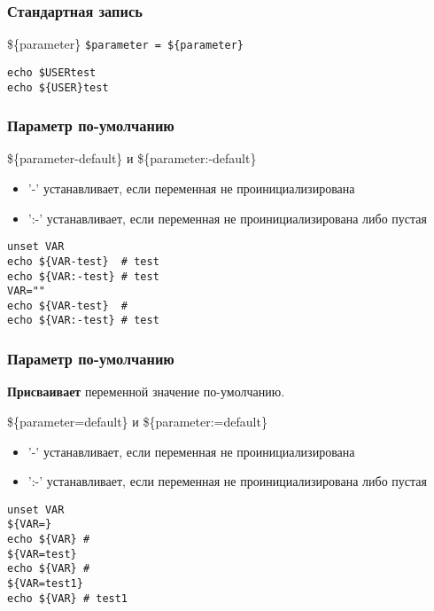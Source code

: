 

\begin{frame}[fragile]
	\frametitle{Стандартная запись}

	\begin{block}{\$\{parameter\}}
		{\tt \$parameter = \$\{parameter\}}

	\begin{lstlisting}
echo $USERtest
echo ${USER}test
	\end{lstlisting}
	\end{block}

\end{frame}

\begin{frame}[fragile]
	\frametitle{Параметр по-умолчанию}

	\begin{block}{\$\{parameter-default\} и \$\{parameter:-default\}}
	\begin{itemize}
		\item '-' устанавливает, если переменная не проинициализирована
		\item ':-' устанавливает, если переменная не проинициализирована либо пустая
	\end{itemize}
	\begin{lstlisting}
unset VAR
echo ${VAR-test}  # test
echo ${VAR:-test} # test
VAR=""
echo ${VAR-test}  #
echo ${VAR:-test} # test
	\end{lstlisting}
	\end{block}

\end{frame}

\begin{frame}[fragile]
	\frametitle{Параметр по-умолчанию}

	{\bf Присваивает} переменной значение по-умолчанию.

	\begin{block}{\$\{parameter=default\} и \$\{parameter:=default\}}
	\begin{itemize}
		\item '-' устанавливает, если переменная не проинициализирована
		\item ':-' устанавливает, если переменная не проинициализирована либо пустая
	\end{itemize}
	\begin{lstlisting}
unset VAR
${VAR=}
echo ${VAR} # 
${VAR=test}
echo ${VAR} # 
${VAR=test1}
echo ${VAR} # test1
	\end{lstlisting}
	\end{block}

\end{frame}

